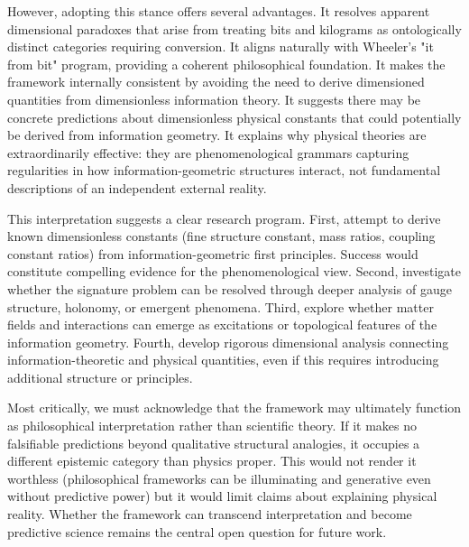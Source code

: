\documentclass[11pt]{article}
\begin{document}
However, adopting this stance offers several advantages. It resolves apparent dimensional paradoxes that arise from treating bits and kilograms as ontologically distinct categories requiring conversion. It aligns naturally with Wheeler's "it from bit" program, providing a coherent philosophical foundation. It makes the framework internally consistent by avoiding the need to derive dimensioned quantities from dimensionless information theory. It suggests there may be concrete predictions about dimensionless physical constants that could potentially be derived from information geometry. It explains why physical theories are extraordinarily effective: they are phenomenological grammars capturing regularities in how information-geometric structures interact, not fundamental descriptions of an independent external reality.

This interpretation suggests a clear research program. First, attempt to derive known dimensionless constants (fine structure constant, mass ratios, coupling constant ratios) from information-geometric first principles. Success would constitute compelling evidence for the phenomenological view. Second, investigate whether the signature problem can be resolved through deeper analysis of gauge structure, holonomy, or emergent phenomena. Third, explore whether matter fields and interactions can emerge as excitations or topological features of the information geometry. Fourth, develop rigorous dimensional analysis connecting information-theoretic and physical quantities, even if this requires introducing additional structure or principles.

Most critically, we must acknowledge that the framework may ultimately function as philosophical interpretation rather than scientific theory. If it makes no falsifiable predictions beyond qualitative structural analogies, it occupies a different epistemic category than physics proper. This would not render it worthless (philosophical frameworks can be illuminating and generative even without predictive power) but it would limit claims about explaining physical reality. Whether the framework can transcend interpretation and become predictive science remains the central open question for future work.
\end{document}
